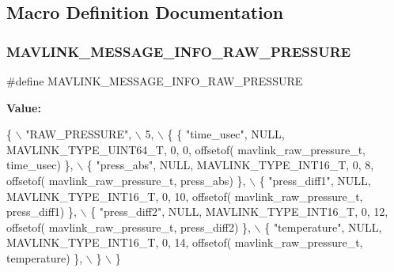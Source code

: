 \subsection{Macro Definition Documentation}
\mbox{\label{mavlink__msg__raw__pressure_8h_abf0074f09b636bbcb8207b4ed8d8e190}} 
\subsubsection{M\+A\+V\+L\+I\+N\+K\+\_\+\+M\+E\+S\+S\+A\+G\+E\+\_\+\+I\+N\+F\+O\+\_\+\+R\+A\+W\+\_\+\+P\+R\+E\+S\+S\+U\+RE}
{\footnotesize\ttfamily \#define M\+A\+V\+L\+I\+N\+K\+\_\+\+M\+E\+S\+S\+A\+G\+E\+\_\+\+I\+N\+F\+O\+\_\+\+R\+A\+W\+\_\+\+P\+R\+E\+S\+S\+U\+RE}

{\bfseries Value\+:}
\begin{DoxyCode}
\{ \(\backslash\)
    \textcolor{stringliteral}{"RAW\_PRESSURE"}, \(\backslash\)
    5, \(\backslash\)
    \{  \{ \textcolor{stringliteral}{"time\_usec"}, NULL, MAVLINK_TYPE_UINT64_T, 0, 0, offsetof(
      mavlink_raw_pressure_t, time\_usec) \}, \(\backslash\)
         \{ \textcolor{stringliteral}{"press\_abs"}, NULL, MAVLINK_TYPE_INT16_T, 0, 8, offsetof(
      mavlink_raw_pressure_t, press\_abs) \}, \(\backslash\)
         \{ \textcolor{stringliteral}{"press\_diff1"}, NULL, MAVLINK_TYPE_INT16_T, 0, 10, offsetof(
      mavlink_raw_pressure_t, press\_diff1) \}, \(\backslash\)
         \{ \textcolor{stringliteral}{"press\_diff2"}, NULL, MAVLINK_TYPE_INT16_T, 0, 12, offsetof(
      mavlink_raw_pressure_t, press\_diff2) \}, \(\backslash\)
         \{ \textcolor{stringliteral}{"temperature"}, NULL, MAVLINK_TYPE_INT16_T, 0, 14, offsetof(
      mavlink_raw_pressure_t, temperature) \}, \(\backslash\)
         \} \(\backslash\)
\}
\end{DoxyCode}
\mbox{\label{mavlink__msg__raw__pressure_8h_ab32314d4d183d2c9dcf9072372fce8b0}} 
